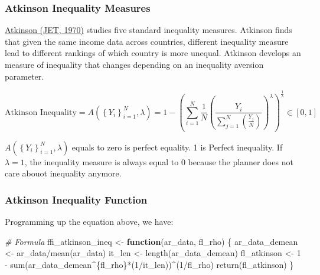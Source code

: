 \documentclass[
]{book}
\newenvironment{Shaded}{\begin{snugshade}}{\end{snugshade}}
\newcommand{\CommentTok}[1]{\textcolor[rgb]{0.56,0.35,0.01}{\textit{#1}}}
\newcommand{\ControlFlowTok}[1]{\textcolor[rgb]{0.13,0.29,0.53}{\textbf{#1}}}
\newcommand{\DecValTok}[1]{\textcolor[rgb]{0.00,0.00,0.81}{#1}}
\newcommand{\FunctionTok}[1]{\textcolor[rgb]{0.00,0.00,0.00}{#1}}
\newcommand{\NormalTok}[1]{#1}
\newcommand{\OtherTok}[1]{\textcolor[rgb]{0.56,0.35,0.01}{#1}}
\newcommand{\SpecialCharTok}[1]{\textcolor[rgb]{0.00,0.00,0.00}{#1}}
\begin{document}
\hypertarget{atkinson-inequality-measures}{%
\subsubsection{Atkinson Inequality Measures}\label{atkinson-inequality-measures}}

\href{https://linkinghub.elsevier.com/retrieve/pii/0022053170900396}{Atkinson (JET, 1970)} studies five standard inequality measures. Atkinson finds that given the same income data across countries, different inequality measure lead to different rankings of which country is more unequal. Atkinson develops an measure of inequality that changes depending on an inequality aversion parameter.

\[
\text{Atkinson Inequality} = 
A\left(
\left\{Y_i\right\}_{i=1}^N,
\lambda
\right) 
= 1 - 
\left(
\sum_{i=1}^N \frac{1}{N}
  \left(
    \frac{Y_i}{\sum_{j=1}^N \left( \frac{Y_j}{N} \right) }
  \right)^{\lambda}  
\right)^{\frac{1}{\lambda}}
\in \left[0,1\right]
\]

\(A\left(\left\{Y_i\right\}_{i=1}^N,\lambda\right)\) equals to zero is perfect equality. 1 is Perfect inequality. If \(\lambda=1\), the inequality measure is always equal to 0 because the planner does not care abouot inequality anymore.

\hypertarget{atkinson-inequality-function}{%
\subsubsection{Atkinson Inequality Function}\label{atkinson-inequality-function}}

Programming up the equation above, we have:

\begin{Shaded}
\begin{Highlighting}[]
\CommentTok{\# Formula}
\NormalTok{ffi\_atkinson\_ineq }\OtherTok{\textless{}{-}} \ControlFlowTok{function}\NormalTok{(ar\_data, fl\_rho) \{}
\NormalTok{  ar\_data\_demean }\OtherTok{\textless{}{-}}\NormalTok{ ar\_data}\SpecialCharTok{/}\FunctionTok{mean}\NormalTok{(ar\_data)}
\NormalTok{  it\_len }\OtherTok{\textless{}{-}} \FunctionTok{length}\NormalTok{(ar\_data\_demean)}
\NormalTok{  fl\_atkinson }\OtherTok{\textless{}{-}} \DecValTok{1} \SpecialCharTok{{-}} \FunctionTok{sum}\NormalTok{(ar\_data\_demean}\SpecialCharTok{\^{}}\NormalTok{\{fl\_rho\}}\SpecialCharTok{*}\NormalTok{(}\DecValTok{1}\SpecialCharTok{/}\NormalTok{it\_len))}\SpecialCharTok{\^{}}\NormalTok{(}\DecValTok{1}\SpecialCharTok{/}\NormalTok{fl\_rho)}
  \FunctionTok{return}\NormalTok{(fl\_atkinson)}
\NormalTok{\}}
\end{Highlighting}
\end{Shaded}
\end{document}
